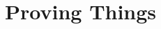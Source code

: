\documentclass[open-logic-section]{subfiles}
\begin{document}
\section{Proving Things}

\end{document}
